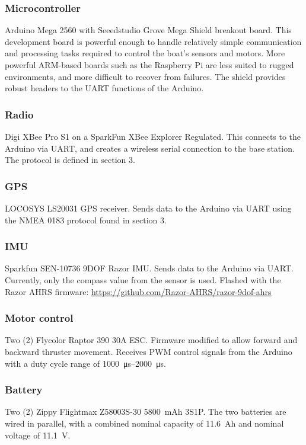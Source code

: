\documentclass[a4paper]{IEEEtran}
\begin{document}
\subsubsection{Microcontroller}
Arduino Mega 2560 with Seeedstudio Grove Mega Shield breakout board. This development board is powerful enough to handle relatively simple communication and processing tasks required to control the boat's sensors and motors. More powerful ARM-based boards such as the Raspberry Pi are less suited to rugged environments, and more difficult to recover from failures. The shield provides robust headers to the UART functions of the Arduino.

\subsubsection{Radio}
Digi XBee Pro S1 on a SparkFun XBee Explorer Regulated. This connects to the Arduino via UART, and creates a wireless serial connection to the base station. The protocol is defined in section 3.

\subsubsection{GPS}
LOCOSYS LS20031 GPS receiver. Sends data to the Arduino via UART using the NMEA 0183 protocol found in section 3. 

\subsubsection{IMU}
Sparkfun SEN-10736 9DOF Razor IMU. Sends data to the Arduino via UART. Currently, only the compass value from the sensor is used. Flashed with the Razor AHRS firmware: \url{https://github.com/Razor-AHRS/razor-9dof-ahrs}

\subsubsection{Motor control}
Two (2) Flycolor Raptor 390 30A ESC. Firmware modified to allow forward and backward thruster movement. Receives PWM control signals from the Arduino with a duty cycle range of \SIrange{1000}{2000}{\micro\second}.

\subsubsection{Battery}
Two (2) Zippy Flightmax Z58003S-30 \SI{5800}{mAh} 3S1P. The two batteries are wired in parallel, with a combined nominal capacity of \SI{11.6}{Ah} and nominal voltage of \SI{11.1}{V}.
\end{document}
